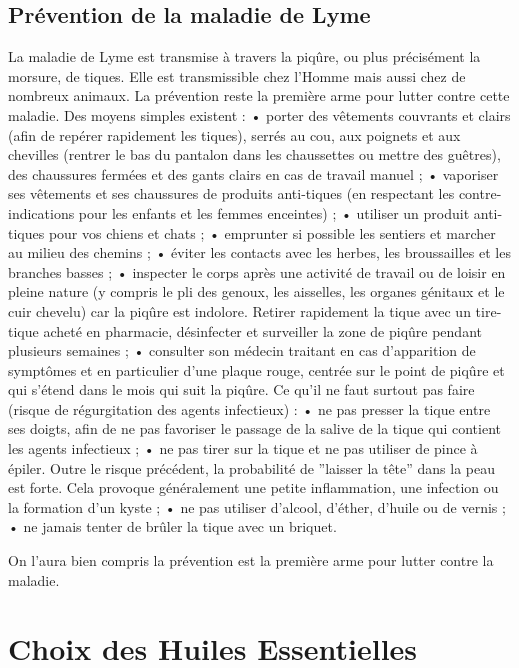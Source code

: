\documentclass[12pt,a4wide]{article}
\begin{document}
\subsection{Prévention de la maladie de Lyme}
\label{sec-3-7}

La maladie de Lyme est transmise à travers la piqûre, ou plus précisément la morsure, de tiques. Elle est transmissible chez l'Homme mais aussi chez de nombreux animaux. 
La prévention reste la première arme pour lutter contre cette maladie.
Des moyens simples existent :
    • porter des vêtements couvrants et clairs (afin de repérer rapidement les tiques), serrés au cou, aux poignets et aux chevilles (rentrer le bas du pantalon dans les chaussettes ou mettre des guêtres), des chaussures fermées et des gants clairs en cas de travail manuel ; 
    • vaporiser ses vêtements et ses chaussures de produits anti-tiques (en respectant les contre-indications pour les enfants et les femmes enceintes) ; 
    • utiliser un produit anti-tiques pour vos chiens et chats ; 
    • emprunter si possible les sentiers et marcher au milieu des chemins ; 
    • éviter les contacts avec les herbes, les broussailles et les branches basses ; 
    • inspecter le corps après une activité de travail ou de loisir en pleine nature (y compris le pli des genoux, les aisselles, les organes génitaux et le cuir chevelu) car la piqûre est indolore. Retirer rapidement la tique avec un tire-tique acheté en pharmacie, désinfecter et surveiller la zone de piqûre pendant plusieurs semaines ; 
    • consulter son médecin traitant en cas d'apparition de symptômes et en particulier d'une plaque rouge, centrée sur le point de piqûre et qui s'étend dans le mois qui suit la piqûre. 
Ce qu'il ne faut surtout pas faire (risque de régurgitation des agents infectieux) :
    • ne pas presser la tique entre ses doigts, afin de ne pas favoriser le passage de la salive de la tique qui contient les agents infectieux ; 
    • ne pas tirer sur la tique et ne pas utiliser de pince à épiler. Outre le risque précédent, la probabilité de ''laisser la tête'' dans la peau est forte. Cela provoque généralement une petite inflammation, une infection ou la formation d'un kyste ; 
    • ne pas utiliser d'alcool, d'éther, d'huile ou de vernis ; 
    • ne jamais tenter de brûler la tique avec un briquet. 


On l'aura bien compris la prévention est la première arme pour lutter contre la maladie.

\section{Choix des Huiles Essentielles}
\label{sec-4}
\end{document}
